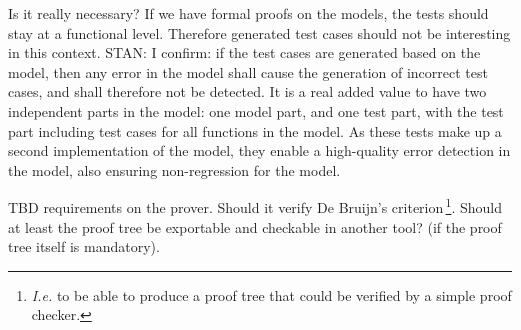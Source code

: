 \documentclass{template/openetcs_article}
\begin{document}

\begin{issue}
Is it really necessary? If we have formal proofs on the models, the tests should stay at a 
functional level. Therefore generated test cases should not be interesting in this context.
STAN: I confirm: if the test cases are generated based on the model, then any error
in the model shall cause the generation of incorrect test cases, and shall therefore not be detected. 
It is a real added value to have two independent parts in the model: one model part, and one test part, 
with the test part including test cases for all functions in the model. As these tests make up a
second implementation of the model, they enable a high-quality error detection in the model, 
also ensuring non-regression for the model. 
\end{issue}

\begin{issue}
TBD requirements on the prover. Should it verify De Bruijn's criterion\,\footnote{\emph{I.e.}
to be able to produce a proof tree that could be verified by a simple proof checker.}.
Should at least the proof tree be exportable and checkable in another tool? (if the proof
tree itself is mandatory).
\end{issue}


\nocite{*}






\end{document}
